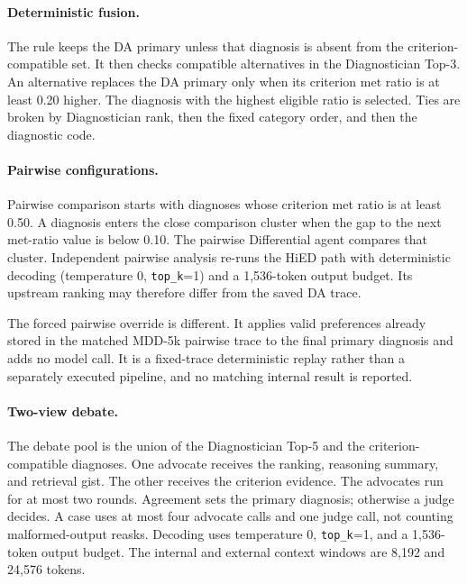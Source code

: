 \documentclass[12pt,a4paper,oneside]{report}
\begin{document}
\paragraph{Deterministic fusion.}
The rule keeps the DA primary unless that diagnosis is absent from the criterion-compatible set. It then checks compatible alternatives in the Diagnostician Top-3. An alternative replaces the DA primary only when its criterion met ratio is at least 0.20 higher. The diagnosis with the highest eligible ratio is selected. Ties are broken by Diagnostician rank, then the fixed category order, and then the diagnostic code.

\paragraph{Pairwise configurations.}
Pairwise comparison starts with diagnoses whose criterion met ratio is at least 0.50. A diagnosis enters the close comparison cluster when the gap to the next met-ratio value is below 0.10. The pairwise Differential agent compares that cluster. Independent pairwise analysis re-runs the HiED path with deterministic decoding (temperature 0, \texttt{top\_k}=1) and a 1,536-token output budget. Its upstream ranking may therefore differ from the saved DA trace.

The forced pairwise override is different. It applies valid preferences already stored in the matched MDD-5k pairwise trace to the final primary diagnosis and adds no model call. It is a fixed-trace deterministic replay rather than a separately executed pipeline, and no matching internal result is reported.

\paragraph{Two-view debate.}
The debate pool is the union of the Diagnostician Top-5 and the criterion-compatible diagnoses. One advocate receives the ranking, reasoning summary, and retrieval gist. The other receives the criterion evidence. The advocates run for at most two rounds. Agreement sets the primary diagnosis; otherwise a judge decides. A case uses at most four advocate calls and one judge call, not counting malformed-output reasks. Decoding uses temperature 0, \texttt{top\_k}=1, and a 1,536-token output budget. The internal and external context windows are 8,192 and 24,576 tokens.
\end{document}
